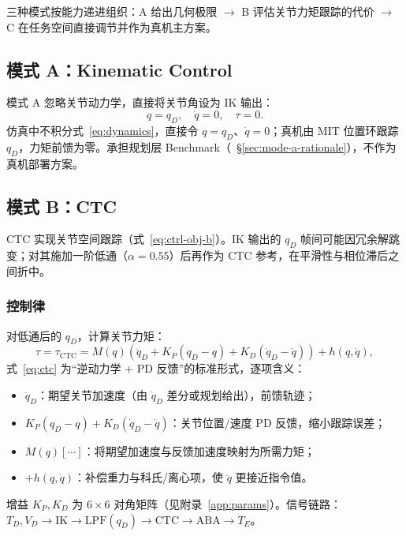 \documentclass[UTF8, a4paper, 12pt]{ctexart}
\begin{document}
三种模式按能力递进组织：A 给出几何极限 $\rightarrow$ B 评估关节力矩跟踪的代价 $\rightarrow$ C 在任务空间直接调节并作为真机主方案。

\subsection{模式 A：Kinematic Control}

模式 A 忽略关节动力学，直接将关节角设为 IK 输出：
\begin{equation}
    q = q_D, \quad \dot{q} = 0, \quad \tau = 0.
\end{equation}
仿真中不积分式~\eqref{eq:dynamics}，直接令 $q=q_D$、$\dot{q}=0$；真机由 MIT 位置环跟踪 $q_D$，力矩前馈为零。承担规划层 Benchmark（~\S\ref{sec:mode-a-rationale}），不作为真机部署方案。

\subsection{模式 B：CTC}

CTC 实现关节空间跟踪（式~\eqref{eq:ctrl-obj-b}）。IK 输出的 $q_D$ 帧间可能因冗余解跳变；对其施加一阶低通（$\alpha=0.55$）后再作为 CTC 参考，在平滑性与相位滞后之间折中。

\subsubsection{控制律}

对低通后的 $q_D$，计算关节力矩：
\begin{equation}
    \tau = \tau_{\mathrm{CTC}}
    = M(q)\left(
    \ddot{q}_D + K_P(q_D - q) + K_D(\dot{q}_D - \dot{q})
    \right) + h(q,\dot{q}),
    \label{eq:ctc}
\end{equation}
式~\eqref{eq:ctc} 为“逆动力学 + PD 反馈”的标准形式，逐项含义：
\begin{itemize}[leftmargin=2em]
    \item $\ddot{q}_D$：期望关节加速度（由 $\dot{q}_D$ 差分或规划给出），前馈轨迹；
    \item $K_P(q_D-q)+K_D(\dot{q}_D-\dot{q})$：关节位置/速度 PD 反馈，缩小跟踪误差；
    \item $M(q)[\cdots]$：将期望加速度与反馈加速度映射为所需力矩；
    \item $+h(q,\dot{q})$：补偿重力与科氏/离心项，使 $\ddot{q}$ 更接近指令值。
\end{itemize}
增益 $K_P,K_D$ 为 $6\times 6$ 对角矩阵（见附录~\ref{app:params}）。信号链路：
$T_D,V_D \rightarrow \mathrm{IK} \rightarrow \mathrm{LPF}(q_D) \rightarrow \mathrm{CTC} \rightarrow \mathrm{ABA} \rightarrow T_E$。
\end{document}
